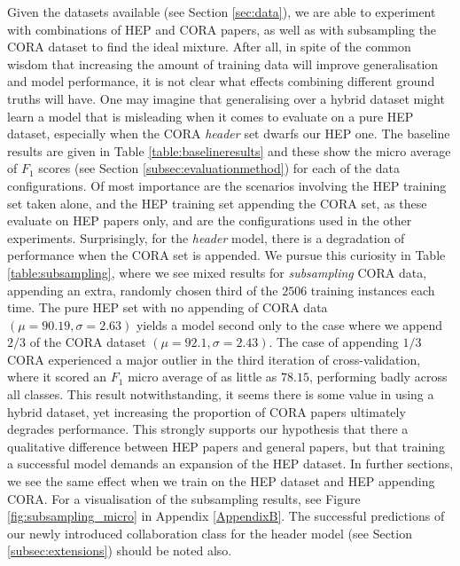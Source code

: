 Given the datasets available (see Section \ref{sec:data}), we are able to experiment with combinations of HEP and CORA papers, as well as with subsampling the CORA dataset to find the ideal mixture. After all, in spite of the common wisdom that increasing the amount of training data will improve generalisation and model performance, it is not clear what effects combining different ground truths will have. One may imagine that generalising over a hybrid dataset might learn a model that is misleading when it comes to evaluate on a pure HEP dataset, especially when the CORA \emph{header} set dwarfs our HEP one. The baseline results are given in Table \ref{table:baselineresults} and these show the micro average of $F_1$ scores (see Section \ref{subsec:evaluationmethod}) for each of the data configurations. Of most importance are the scenarios involving the HEP training set taken alone, and the HEP training set appending the CORA set, as these evaluate on HEP papers only, and are the configurations used in the other experiments. Surprisingly, for the \emph{header} model, there is a degradation of performance when the CORA set is appended. We pursue this curiosity in Table \ref{table:subsampling}, where we see mixed results for \emph{subsampling} CORA data, appending an extra, randomly chosen third of the $2506$ training instances each time. The pure HEP set with no appending of CORA data $(\mu = 90.19, \sigma = 2.63)$ yields a model second only to the case where we append $2/3$ of the CORA dataset $(\mu = 92.1, \sigma = 2.43)$. The case of appending $1/3$ CORA experienced a major outlier in the third iteration of cross-validation, where it scored an $F_1$ micro average of as little as $78.15$, performing badly across all classes. This result notwithstanding, it seems there is some value in using a hybrid dataset, yet increasing the proportion of CORA papers ultimately degrades performance. This strongly supports our hypothesis that there a qualitative difference between HEP papers and general papers, but that training a successful model demands an expansion of the HEP dataset. In further sections, we see the same effect when we train on the HEP dataset and HEP appending CORA. For a visualisation of the subsampling results, see Figure \ref{fig:subsampling_micro} in Appendix \ref{AppendixB}. The successful predictions of our newly introduced collaboration class for the header model (see Section \ref{subsec:extensions}) should be noted also.

